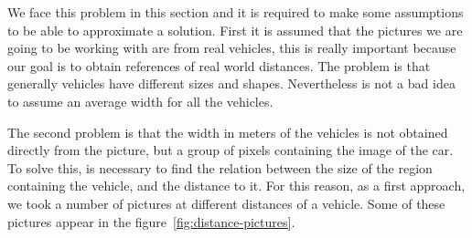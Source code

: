 We face this problem in this section and it is required to make some
assumptions to be able to approximate a solution. First it is assumed that the
pictures we are going to be working with are from real vehicles, this is really
important because our goal is to obtain references of real world distances. The
problem is that generally vehicles have different sizes and shapes. Nevertheless
is not a bad idea to assume an average width for all the vehicles. 

The second problem is that the width in meters of the vehicles is not obtained 
directly from the picture, but a group of pixels containing the image of
the car. To solve this, is necessary to find the relation between the size of
the region containing the vehicle, and the distance to it. For this reason, as a first
approach, we took a number of pictures at different distances of a vehicle. Some of 
these pictures appear in the figure~\ref{fig:distance-pictures}.

